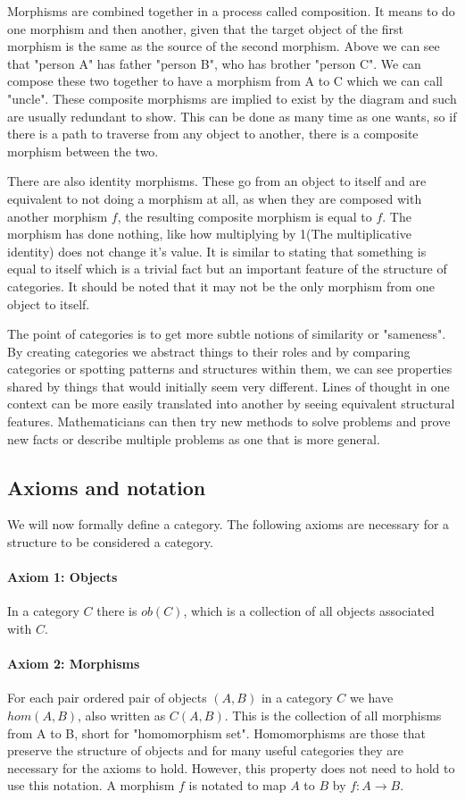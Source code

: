 \documentclass[10pt,a4paper]{amsart}
\begin{document}
Morphisms are combined together in a process called composition.
It means to do one morphism and then another, given that the target object of the first morphism is the same as the source of the second morphism.
Above we can see that "person A" has father "person B", who has brother "person C".
We can compose these two together to have a morphism from A to C which we can call "uncle".
These composite morphisms are implied to exist by the diagram and such are usually redundant to show.
This can be done as many time as one wants, so if there is a path to traverse from any object to another, there is a composite morphism between the two.

There are also identity morphisms.
These go from an object to itself and are equivalent to not doing a morphism at all,
as when they are composed with another morphism $f$, the resulting composite morphism is equal to $f$.
The morphism has done nothing, like how multiplying by 1(The multiplicative identity) does not change it's value.
It is similar to stating that something is equal to itself which is a trivial fact but an important feature of the structure of categories.
It should be noted that it may not be the only morphism from one object to itself.

The point of categories is to get more subtle notions of similarity or "sameness".
By creating categories we abstract things to their roles and by comparing categories or spotting patterns and structures within them,
we can see properties shared by things that would initially seem very different.
Lines of thought in one context can be more easily translated into another by seeing equivalent structural features.
Mathematicians can then try new methods to solve problems and prove new facts or describe multiple problems as one that is more general.
\subsection{Axioms and notation}
We will now formally define a category. The following axioms are necessary for a structure to be considered a category.
\paragraph{Axiom 1: Objects}
In a category $C$ there is $ob(C)$, which is a collection of all objects associated with $C$.
\paragraph{Axiom 2: Morphisms}
For each pair ordered pair of objects $(A,B)$ in a category $C$ we have $hom(A,B)$, also written as $C(A,B)$.
This is the collection of all morphisms from A to B, short for "homomorphism set".
Homomorphisms are those that preserve the structure of objects and for many useful categories they are necessary for the axioms to hold.
However, this property does not need to hold to use this notation.
A morphism $f$ is notated to map $A$ to $B$ by $f: A\to B$.
\end{document}
